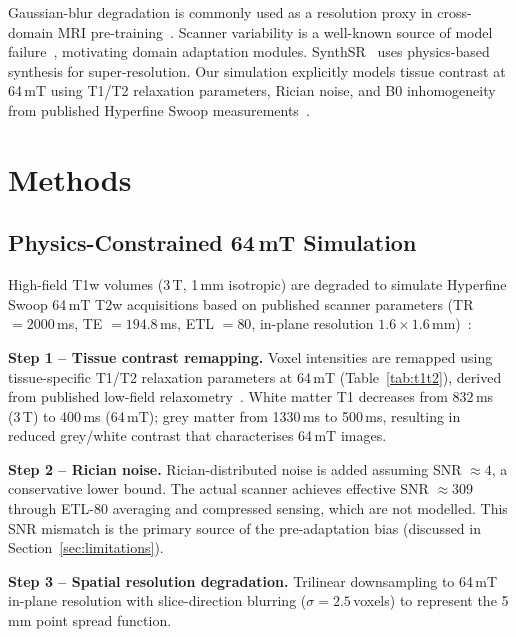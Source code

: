 \documentclass[12pt,a4paper]{article}
\begin{document}
Gaussian-blur degradation is commonly used as a resolution proxy in
cross-domain MRI pre-training~\cite{zhao2021superresolution}. Scanner
variability is a well-known source of model failure~\cite{karani2018lifelong,dewey2019deepharmony},
motivating domain adaptation modules. SynthSR~\cite{iglesias2023synthsr}
uses physics-based synthesis for super-resolution. Our simulation
explicitly models tissue contrast at 64\,mT using T1/T2 relaxation
parameters, Rician noise, and B0 inhomogeneity from published Hyperfine
Swoop measurements~\cite{vasa2025}.

\section{Methods}
\label{sec:methods}

\subsection{Physics-Constrained 64\,mT Simulation}
\label{sec:sim}

High-field T1w volumes (3\,T, 1\,mm isotropic) are degraded to simulate
Hyperfine Swoop 64\,mT T2w acquisitions based on published scanner
parameters (TR $= 2000$\,ms, TE $= 194.8$\,ms, ETL $= 80$, in-plane
resolution $1.6 \times 1.6$\,mm)~\cite{vasa2025}:

\textbf{Step 1 -- Tissue contrast remapping.}
Voxel intensities are remapped using tissue-specific T1/T2 relaxation
parameters at 64\,mT (Table~\ref{tab:t1t2}), derived from published
low-field relaxometry~\cite{deichmann2002}. White matter T1 decreases from
832\,ms (3\,T) to 400\,ms (64\,mT); grey matter from 1330\,ms to 500\,ms,
resulting in reduced grey/white contrast that characterises 64\,mT images.

\textbf{Step 2 -- Rician noise.}
Rician-distributed noise is added assuming SNR $\approx 4$, a conservative
lower bound. The actual scanner achieves effective SNR $\approx 309$ through
ETL-80 averaging and compressed sensing, which are not modelled. This SNR
mismatch is the primary source of the pre-adaptation bias (discussed in
Section~\ref{sec:limitations}).

\textbf{Step 3 -- Spatial resolution degradation.}
Trilinear downsampling to 64\,mT in-plane resolution with slice-direction
blurring ($\sigma = 2.5$\,voxels) to represent the 5\,mm point spread
function.
\end{document}
